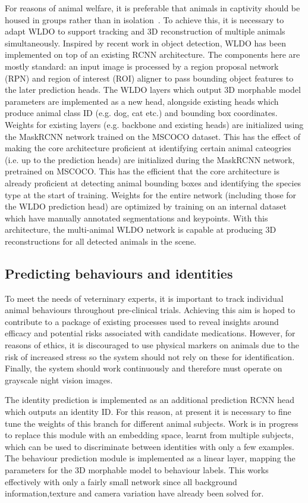  For reasons of animal welfare, it is preferable that animals in captivity should be housed in groups rather than in isolation~\cite{xxx}. To achieve this, it is necessary to adapt WLDO to support tracking and 3D reconstruction of multiple animals simultaneously. Inspired by recent work in object detection, WLDO has been implemented on top of an existing RCNN architecture. The components here are mostly standard: an input image is processed by a region proposal network (RPN) and region of interest (ROI) aligner to pass bounding object features to the later prediction heads. The WLDO layers which output 3D morphable model parameters are implemented as a new head, alongside existing heads which produce animal class ID (e.g. dog, cat etc.) and bounding box coordinates. Weights for existing layers (e.g. backbone and existing heads) are initialized using the MaskRCNN network trained on the MSCOCO dataset. This has the effect of making the core architecture proficient at identifying certain animal cateogries (i.e. up to the prediction heads) are initialized during the MaskRCNN network, pretrained on MSCOCO. This has the efficient that the core architecture is already proficient at detecting animal bounding boxes and identifying the species type at the start of training. Weights for the entire network (including those for the WLDO prediction head) are optimized by training on an internal dataset which have manually annotated segmentations and keypoints. With this architecture, the multi-animal WLDO network is capable at producing 3D reconstructions for all detected animals in the scene.

 \subsection{Predicting behaviours and identities}
 
 To meet the needs of veterninary experts, it is important to track individual animal behaviours throughout pre-clinical trials. Achieving this aim is hoped to contribute to a package of existing processes used to reveal insights around efficacy and potential risks associated with candidate medications. However, for reasons of ethics, it is discouraged to use physical markers on animals due to the risk of increased stress so the system should not rely on these for identification. Finally, the system should work continuously and therefore must operate on grayscale night vision images.

 The identity prediction is implemented as an additional prediction RCNN head which outputs an identity ID. For this reason, at present it is necessary to fine tune the weights of this branch for different animal subjects. Work is in progress to replace this module with an embedding space, learnt from multiple subjects, which can be used to discriminate between identities with only a few examples. The behaviour prediction module is implemented as a linear layer, mapping the parameters for the 3D morphable model to behaviour labels. This works effectively with only a fairly small network since all background information,texture and camera variation have already been solved for. 

